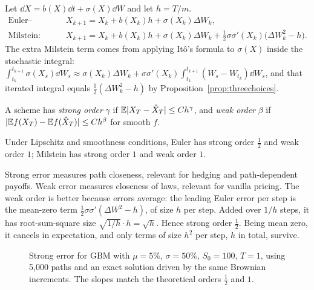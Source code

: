 Let $\dd X=b(X)\dd t+\sigma(X)\dd W$ and let $h=T/m$.
\begin{align*}
\text{Euler--Maruyama:}\quad&X_{k+1}=X_k+b(X_k)h+\sigma(X_k)\Delta W_k,\\
\text{Milstein:}\quad&X_{k+1}=X_k+b(X_k)h+\sigma(X_k)\Delta W_k+\tfrac12\sigma\sigma'(X_k)\bigl(\Delta W_k^2-h\bigr).
\end{align*}
The extra Milstein term comes from applying It\^o's formula to $\sigma(X)$ inside the stochastic integral:
$\int_{t_k}^{t_{k+1}}\sigma(X_s)\dd W_s\approx\sigma(X_k)\Delta W_k+\sigma\sigma'(X_k)\int_{t_k}^{t_{k+1}}(W_s-W_{t_k})\dd W_s$, and that iterated integral equals $\tfrac12(\Delta W_k^2-h)$ by Proposition~\ref{prop:threechoices}.

\begin{definition}
A scheme has \emph{strong order} $\gamma$ if $\mathbb{E}|X_T-\hat X_T|\le Ch^\gamma$, and \emph{weak order} $\beta$ if $|\mathbb{E} f(X_T)-\mathbb{E} f(\hat X_T)|\le Ch^\beta$ for smooth $f$.
\end{definition}

\begin{theorem}[Stated]
Under Lipschitz and smoothness conditions, Euler has strong order $\tfrac12$ and weak order $1$; Milstein has strong order $1$ and weak order $1$.
\end{theorem}

\begin{intuition}
Strong error measures path closeness, relevant for hedging and path-dependent payoffs. Weak error measures closeness of laws, relevant for vanilla pricing. The weak order is better because errors average: the leading Euler error per step is the mean-zero term $\tfrac12\sigma\sigma'(\Delta W^2-h)$, of size $h$ per step. Added over $1/h$ steps, it has root-sum-square size $\sqrt{1/h}\cdot h=\sqrt h$. Hence strong order $\tfrac12$. Being mean zero, it cancels in expectation, and only terms of size $h^2$ per step, $h$ in total, survive.
\end{intuition}

\begin{figure}[t]
\centering
{}
\caption{Strong error for GBM with $\mu=5\%$, $\sigma=50\%$, $S_0=100$, $T=1$, using 5{,}000 paths and an exact solution driven by the same Brownian increments. The slopes match the theoretical orders $\tfrac12$ and $1$.}\label{fig:strong}
\end{figure}

